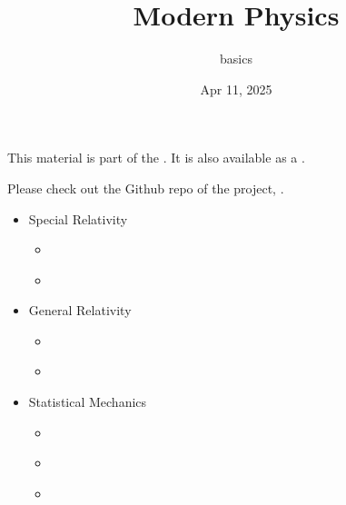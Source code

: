 \documentclass[letterpaper,10pt,english]{jupyterBook}
\title{Modern Physics}
\date{Apr 11, 2025}
\author{basics}
\begin{document}
\pagestyle{empty}
\sphinxmaketitle
\pagestyle{plain}
\sphinxtableofcontents
\pagestyle{normal}
\label{\detokenize{intro::doc}}


\sphinxAtStartPar
This material is part of the . It is also available as a .

\sphinxAtStartPar
Please check out the Github repo of the project, .
\begin{itemize}
\item {} 
\sphinxAtStartPar
Special Relativity

\begin{itemize}
\item {} 
\sphinxAtStartPar
{\hyperref[\detokenize{ch/relativity-special/intro::doc}]{}}

\item {} 
\sphinxAtStartPar
{\hyperref[\detokenize{ch/relativity-special/notes::doc}]{}}

\end{itemize}
\end{itemize}
\begin{itemize}
\item {} 
\sphinxAtStartPar
General Relativity

\begin{itemize}
\item {} 
\sphinxAtStartPar
{\hyperref[\detokenize{ch/relativity-general/intro::doc}]{}}

\item {} 
\sphinxAtStartPar
{\hyperref[\detokenize{ch/relativity-general/notes::doc}]{}}

\end{itemize}
\end{itemize}
\begin{itemize}
\item {} 
\sphinxAtStartPar
Statistical Mechanics

\begin{itemize}
\item {} 
\sphinxAtStartPar
{\hyperref[\detokenize{ch/statistical-mechanics/intro::doc}]{}}

\item {} 
\sphinxAtStartPar
{\hyperref[\detokenize{ch/statistical-mechanics/notes::doc}]{}}

\item {} 
\sphinxAtStartPar
{\hyperref[\detokenize{ch/statistical-mechanics/statistics::doc}]{}}

\end{itemize}
\end{itemize}
\end{document}
